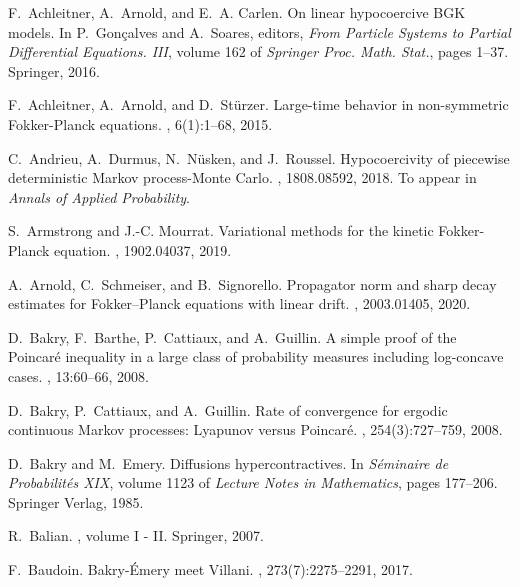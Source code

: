 \documentclass{article}
\begin{document}
\begin{thebibliography}{10}

F.~Achleitner, A.~Arnold, and E.~A. Carlen.
\newblock On linear hypocoercive {BGK} models.
\newblock In P.~Gonçalves and A.~Soares, editors, {\em From Particle Systems
  to Partial Differential Equations. {III}}, volume 162 of {\em Springer Proc.
  Math. Stat.}, pages 1--37. Springer, 2016.

F.~Achleitner, A.~Arnold, and D.~St{\"u}rzer.
\newblock Large-time behavior in non-symmetric {F}okker-{P}lanck equations.
, 6(1):1--68, 2015.

C.~Andrieu, A.~Durmus, N.~N{\"u}sken, and J.~Roussel.
\newblock Hypocoercivity of piecewise deterministic {M}arkov process-{Monte
  Carlo}.
, 1808.08592, 2018.
\newblock To appear in \emph{Annals of Applied Probability}.

S.~Armstrong and J.-C. Mourrat.
\newblock Variational methods for the kinetic {Fokker-Planck} equation.
, 1902.04037, 2019.

A.~Arnold, C.~Schmeiser, and B.~Signorello.
\newblock Propagator norm and sharp decay estimates for {Fokker--Planck}
  equations with linear drift.
, 2003.01405, 2020.

D.~Bakry, F.~Barthe, P.~Cattiaux, and A.~Guillin.
\newblock A simple proof of the {P}oincar\'e inequality in a large class of
  probability measures including log-concave cases.
, 13:60--66, 2008.

D.~Bakry, P.~Cattiaux, and A.~Guillin.
\newblock Rate of convergence for ergodic continuous {M}arkov processes:
  {L}yapunov versus {P}oincar\'{e}.
, 254(3):727--759, 2008.

D.~Bakry and M.~Emery.
\newblock Diffusions hypercontractives.
\newblock In {\em Séminaire de Probabilités XIX}, volume 1123 of {\em Lecture
  Notes in Mathematics}, pages 177--206. Springer Verlag, 1985.

R.~Balian.
, volume I - II.
\newblock Springer, 2007.

F.~Baudoin.
\newblock Bakry-\'{E}mery meet {V}illani.
, 273(7):2275--2291, 2017.


\end{thebibliography}
\end{document}
